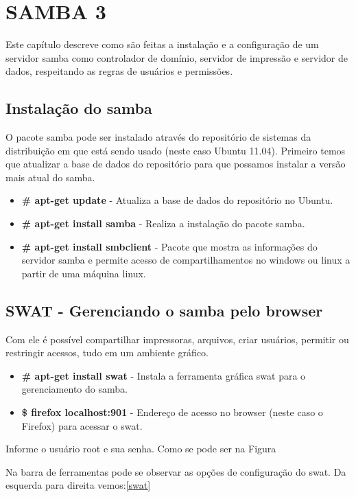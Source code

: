 \chapter{SAMBA 3}
Este capítulo descreve como são feitas a instalação e a configuração de um servidor samba como controlador de domínio, servidor de impressão e servidor de dados, respeitando as regras de usuários e permissões.

\section{Instalação do samba}

O pacote samba pode ser instalado através do repositório de sistemas da distribuição em que está sendo usado (neste caso Ubuntu 11.04). Primeiro temos que atualizar a base de dados do repositório para que possamos instalar a versão mais atual do samba.

\begin{itemize}
    \item \textbf{\# apt-get update} - Atualiza a base de dados do repositório no Ubuntu.
    \item \textbf{\# apt-get install samba} - Realiza a instalação do pacote samba.
    \item \textbf{\# apt-get install smbclient} - Pacote que mostra as informações do servidor samba e permite acesso de compartilhamentos no windows ou linux a partir de uma máquina linux.
\end{itemize}

\section{SWAT - Gerenciando o samba pelo browser}

Com ele é possível compartilhar impressoras, arquivos, criar usuários, permitir ou restringir acessos, tudo em um ambiente gráfico.

\begin{itemize}
 \item \textbf{\# apt-get install swat} - Instala a ferramenta gráfica swat para o gerenciamento do samba.
    \item \textbf{\$ firefox localhost:901} - Endereço de acesso no browser (neste caso o Firefox) para acessar o swat.
\end{itemize}

Informe o usuário root e sua senha. Como se pode ser na Figura 

Na barra de ferramentas pode se observar as opções de configuração do swat. Da esquerda para direita vemos:\ref{swat}

